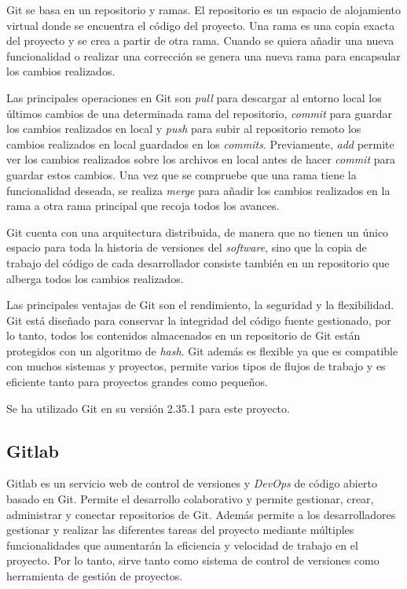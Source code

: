 Git se basa en un repositorio y ramas. El repositorio es un espacio de alojamiento virtual donde se encuentra el código del proyecto. Una rama es una copia exacta del proyecto y se crea a partir de otra rama. Cuando se quiera añadir una nueva funcionalidad o realizar una corrección se genera una nueva rama para encapsular los cambios realizados.

Las principales operaciones en Git son \textit{pull} para descargar al entorno local los últimos cambios de una determinada rama del repositorio, \textit{commit} para guardar los cambios realizados en local y \textit{push} para subir al repositorio remoto los cambios realizados en local guardados en los \textit{commits}. Previamente, \textit{add} permite ver los cambios realizados sobre los archivos en local antes de hacer \textit{commit} para guardar estos cambios. Una vez que se compruebe que una rama tiene la funcionalidad deseada, se realiza \textit{merge} para añadir los cambios realizados en la rama a otra rama principal que recoja todos los avances.

Git cuenta con una arquitectura distribuida, de manera que no tienen un único espacio para toda la historia de versiones del \textit{software}, sino que la copia de trabajo del código de cada desarrollador consiste también en un repositorio que alberga todos los cambios realizados.

Las principales ventajas de Git son el rendimiento, la seguridad y la flexibilidad. Git está diseñado para conservar la integridad del código fuente gestionado, por lo tanto, todos los contenidos almacenados en un repositorio de Git están protegidos con un algoritmo de \textit{hash}. Git además es flexible ya que es compatible con muchos sistemas y proyectos, permite varios tipos de flujos de trabajo y es eficiente tanto para proyectos grandes como pequeños.

Se ha utilizado Git en su versión 2.35.1 para este proyecto.


\subsection{Gitlab}
Gitlab \cite{gitlab} es un servicio web de control de versiones y \textit{DevOps} de código abierto basado en Git. Permite el desarrollo colaborativo y permite gestionar, crear, administrar y conectar repositorios de Git. Además permite a los desarrolladores gestionar y realizar las diferentes tareas del proyecto mediante múltiples funcionalidades que aumentarán la eficiencia y velocidad de trabajo en el proyecto. Por lo tanto, sirve tanto como sistema de control de versiones como herramienta de gestión de proyectos.


